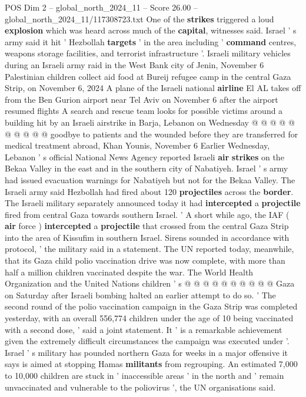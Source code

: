 \begin{textsample}{POS Dim 2 – global\_north\_2024\_11 – Score 26.00 – global\_north\_2024\_11/117308723.txt}
One of the \textbf{strikes} triggered a loud \textbf{explosion} which was heard across much of the \textbf{capital}, witnesses said.
Israel ' s army said it hit ' Hezbollah \textbf{targets} ' in the area including ' \textbf{command} centres, weapons storage facilities, and terrorist infrastructure '.
Israeli military vehicles during an Israeli army raid in the West Bank city of Jenin, November 6 Palestinian children collect aid food at Bureij refugee camp in the central Gaza Strip, on November 6, 2024 A plane of the Israeli national \textbf{airline} El AL takes off from the Ben Gurion airport near Tel Aviv on November 6 after the airport resumed flights A search and rescue team looks for possible victims around a building hit by an Israeli airstrike in Barja, Lebanon on Wednesday @ @ @ @ @ @ @ @ @ @ goodbye to patients and the wounded before they are transferred for medical treatment abroad, Khan Younis, November 6 Earlier Wednesday, Lebanon ' s official National News Agency reported Israeli \textbf{air} \textbf{strikes} on the Bekaa Valley in the east and in the southern city of Nabatiyeh.
Israel ' s army had issued evacuation warnings for Nabatiyeh but not for the Bekaa Valley.
The Israeli army said Hezbollah had fired about 120 \textbf{projectiles} across the \textbf{border}.
The Israeli military separately announced today it had \textbf{intercepted} a \textbf{projectile} fired from central Gaza towards southern Israel. ' A short while ago, the IAF ( \textbf{air} force ) \textbf{intercepted} a \textbf{projectile} that crossed from the central Gaza Strip into the area of Kissufim in southern Israel.
Sirens sounded in accordance with protocol, ' the military said in a statement.
The UN reported today, meanwhile, that its Gaza child polio vaccination drive was now complete, with more than half a million children vaccinated despite the war.
The World Health Organization and the United Nations children ' s @ @ @ @ @ @ @ @ @ @ Gaza on Saturday after Israeli bombing halted an earlier attempt to do so. ' The second round of the polio vaccination campaign in the Gaza Strip was completed yesterday, with an overall 556,774 children under the age of 10 being vaccinated with a second dose, ' said a joint statement.
It ' is a remarkable achievement given the extremely difficult circumstances the campaign was executed under '.
Israel ' s military has pounded northern Gaza for weeks in a major offensive it says is aimed at stopping Hamas \textbf{militants} from regrouping.
An estimated 7,000 to 10,000 children are stuck in ' inaccessible areas ' in the north and ' remain unvaccinated and vulnerable to the poliovirus ', the UN organisations said.

\end{textsample}
